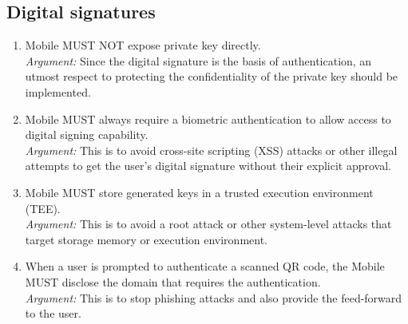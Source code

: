     \subsection{Digital signatures}
        \begin{enumerate}[resume]
                \item Mobile MUST NOT expose private key directly.\\
                \textit{Argument:} Since the digital signature is the basis of authentication, an utmost respect to 
                                   protecting the confidentiality of the private key should be implemented.

                \item Mobile MUST always require a biometric authentication to allow access to digital signing 
                      capability.\\        
                \textit{Argument:} This is to avoid cross-site scripting (XSS) attacks or other illegal attempts to 
                                   get the user's digital signature without their explicit approval.

                \item Mobile MUST store generated keys in a trusted execution environment (TEE).\\        
                \textit{Argument:} This is to avoid a root attack or other system-level attacks that target storage 
                                   memory or execution environment.

                \item When a user is prompted to authenticate a scanned QR code, the Mobile MUST disclose the domain
                      that requires the authentication.\\
                \textit{Argument:} This is to stop phishing attacks and also provide the feed-forward to the user.
        \end{enumerate}

